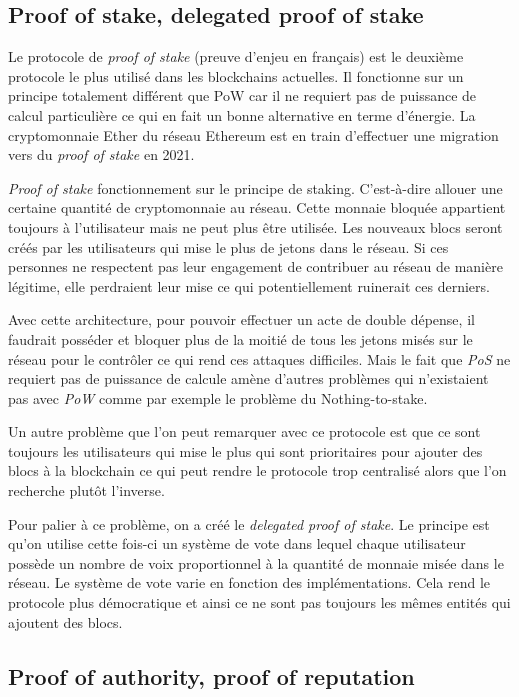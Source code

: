 \subsection{Proof of stake, delegated proof of stake}
\label{consensus:pos}

Le protocole de \textit{proof of stake} (preuve d'enjeu en français) est le deuxième protocole le plus utilisé dans les blockchains actuelles. Il fonctionne sur un principe totalement différent que PoW car il ne requiert pas de puissance de calcul particulière ce qui en fait un bonne alternative en terme d'énergie. La cryptomonnaie Ether du réseau Ethereum est en train d'effectuer une migration vers du \textit{proof of stake} en 2021.

\textit{Proof of stake} fonctionnement sur le principe de staking. C'est-à-dire allouer une certaine quantité de cryptomonnaie au réseau. Cette monnaie bloquée appartient toujours à l'utilisateur mais ne peut plus être utilisée. Les nouveaux blocs seront créés par les utilisateurs qui mise le plus de jetons dans le réseau. Si ces personnes ne respectent pas leur engagement de contribuer au réseau de manière légitime, elle perdraient leur mise ce qui potentiellement ruinerait ces derniers. 

Avec cette architecture, pour pouvoir effectuer un acte de double dépense, il faudrait posséder et bloquer plus de la moitié de tous les jetons misés sur le réseau pour le contrôler ce qui rend ces attaques difficiles. Mais le fait que \textit{PoS} ne requiert pas de puissance de calcule amène d'autres problèmes qui n'existaient pas avec \textit{PoW} comme par exemple le problème du Nothing-to-stake.

Un autre problème que l'on peut remarquer avec ce protocole est que ce sont toujours les utilisateurs qui mise le plus qui sont prioritaires pour ajouter des blocs à la blockchain ce qui peut rendre le protocole trop centralisé alors que l'on recherche plutôt l'inverse.

Pour palier à ce problème, on a créé le \textit{delegated proof of stake}. Le principe est qu'on utilise cette fois-ci un système de vote dans lequel chaque utilisateur possède un nombre de voix proportionnel à la quantité de monnaie misée dans le réseau. Le système de vote varie en fonction des implémentations. Cela rend le protocole plus démocratique et ainsi ce ne sont pas toujours les mêmes entités qui ajoutent des blocs.

\subsection{Proof of authority, proof of reputation}
\label{consensus:poa}

